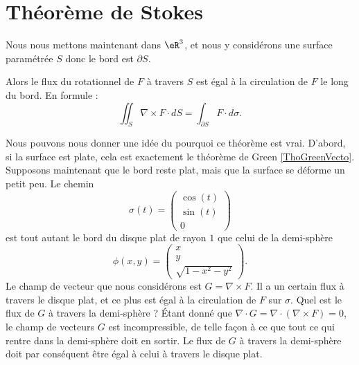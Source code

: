 \section{Théorème de Stokes}

Nous nous mettons maintenant dans $\eR^3$, et nous y considérons une surface paramétrée $S$ donc le bord est $\partial S$. 

\begin{theorem}
    Alors le flux du rotationnel de $F$ à travers $S$ est égal à la circulation de $F$ le long du bord. En formule :
    \begin{equation}
        \iint_S\nabla\times F\cdot dS=\int_{\partial S} F\cdot d\sigma.
    \end{equation}
\end{theorem}

Nous pouvons nous donner une idée du pourquoi ce théorème est vrai. D'abord, si la surface est plate, cela est exactement le théorème de Green \ref{ThoGreenVecto}. Supposons maintenant que le bord reste plat, mais que la surface se déforme un petit peu. Le chemin
\begin{equation}
    \sigma(t)=\begin{pmatrix}
        \cos(t)    \\ 
        \sin(t)    \\ 
        0    
    \end{pmatrix}
\end{equation}
est tout autant le bord du disque plat de rayon $1$ que celui de la demi-sphère
\begin{equation}
    \phi(x,y)=\begin{pmatrix}
        x    \\ 
        y    \\ 
        \sqrt{1-x^2-y^2}    
    \end{pmatrix}.
\end{equation}
Le champ de vecteur que nous considérons est $G=\nabla\times F$. Il a un certain flux à travers le disque plat, et ce plus est égal à la circulation de $F$ sur $\sigma$. Quel est le flux de $G$ à travers la demi-sphère ? Étant donné que $\nabla\cdot G=\nabla\cdot(\nabla\times F)=0$, le champ de vecteurs $G$ est incompressible, de telle façon à ce que tout ce qui rentre dans la demi-sphère doit en sortir. Le flux de $G$ à travers la demi-sphère doit par conséquent être égal à celui à travers le disque plat.


